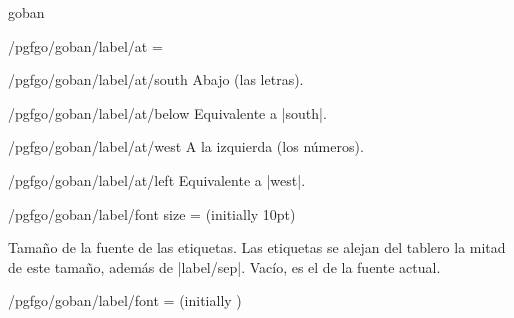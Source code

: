 \begin{environment}{{goban}}
\begin{key}{/pgfgo/goban/label/at =}
		\begin{stylekey}{/pgfgo/goban/label/at/south}
			Abajo (las letras).
		\end{stylekey}
		\begin{stylekey}{/pgfgo/goban/label/at/below}
			Equivalente a |south|.
		\end{stylekey}
		
		\begin{stylekey}{/pgfgo/goban/label/at/west}
			A la izquierda (los números).
		\end{stylekey}
		\begin{stylekey}{/pgfgo/goban/label/at/left}
			Equivalente a |west|.
		\end{stylekey}
		
		\begin{codeexample}[]
			\begin{goban}[12, label = {at = {all}}]
			\end{goban}
			
			\begin{goban}[partial = A6:I9, label = {at = north}]
			\end{goban}
			
			\begin{goban}[partial = B2:E4, label = {at = {north, east}}]
			\end{goban}
		\end{codeexample}
	\end{key}
	
	\begin{key}{/pgfgo/goban/label/font size =  (initially 10pt)}

		Tamaño de la fuente de las etiquetas. Las etiquetas se alejan del tablero la mitad de este tamaño, además de |label/sep|. Vacío, es el de la fuente actual.

		\begin{codeexample}[]
			\begin{goban}[5, label = {at = {south, west}}]
			\end{goban}

			\begin{goban}[5, label = {at = {south, west}, font size = 6pt}]
			\end{goban}
		\end{codeexample}
	\end{key}

	\begin{key}{/pgfgo/goban/label/font =  (initially \texttt{\string\normalfont})}


\end{key}
\end{environment}
